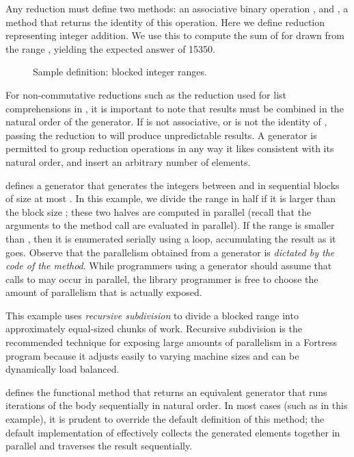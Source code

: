 Any reduction must define two methods: an associative binary operation
, and , a method that returns the identity of
this operation.  Here we define reduction  representing integer
addition.  We use this to compute the sum of  for 
drawn from the range ,
yielding the expected answer of 15350.

\begin{figure}

\caption{Sample  definition: blocked integer ranges.}
\end{figure}

For non-commutative reductions such as the  reduction used for
list comprehensions in , it is important to
note that results must be combined in the natural order of the
generator.  If  is not associative, or  is not
the identity of , passing the reduction to 
will produce unpredictable results.  A generator is permitted to group
reduction operations in any way it likes consistent with its natural
order, and insert an arbitrary number of  elements.

 defines a generator that generates the integers
between  and  in sequential blocks of size at most
.  In this example, we divide the range in half if it is larger
than the block size ; these two halves are computed in parallel
(recall that the arguments to the method call
 are evaluated in parallel).  If the
range is smaller than , then it is enumerated serially using a
 loop, accumulating the result  as it goes.  Observe
that the parallelism obtained from a generator is \emph{dictated by
  the code of the  method}.  While programmers using a
generator should assume that calls to  may occur in
parallel, the library programmer is free to choose the amount of
parallelism that is actually exposed.

This example uses \emph{recursive subdivision} to divide a blocked
range into approximately equal-sized chunks of work.  Recursive
subdivision is the recommended technique for exposing large amounts of
parallelism in a Fortress program because it adjusts easily to varying
machine sizes and can be dynamically load balanced.

 defines the functional method
 that returns an equivalent generator that
runs iterations of the body sequentially in natural order.  In most
cases (such as in this example), it is prudent to override the default
definition of this method; the default implementation of 
effectively collects the generated elements together in parallel and
traverses the result sequentially.

